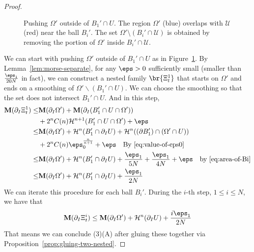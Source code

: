 \begin{lemma}
\begin{proof}
\begin{figure}[htbp]
            \caption{Pushing $\Omega'$ outside of $B_1'\cap U$. The region $\Omega'$ (blue) overlaps with $\mathcal{U}$ (red) near the ball $B_i'$. The set $\Omega' \setminus (B_i' \cap \mathcal{U})$ is obtained by removing the portion of $\Omega'$ inside $B_i' \cap \mathcal{U}$.}
            \label{fig:2675}
        \end{figure}
        
        We can start with pushing $\Omega'$ outside of $B_1'\cap U$ as in Figure~\ref{fig:2675}. By Lemma~\ref{lem:morse-separate}, for any $\eps > 0$ sufficiently small (smaller than $\frac{\eps_1}{20N}$ in fact), we can construct a nested family $\br{{\Xi_t^1}}$ that starts on $\Omega'$ and ends on a smoothing of $\Omega'\backslash(B_1'\cap U)$. We can choose the smoothing so that the set does not intersect $B_1'\cap U$. And in this step, 
        \begin{equation*}
            \begin{split}
                \mathbf{M}(\partial_I\Xi_t^1) \leq& \mathbf{M}(\partial_I\Omega') + \mathbf{M}(\partial_I(B_1'\cap U\cap \Omega'))\\
                &+2^nC(n)\mathcal{H}^{n+1}(B_1'\cap U\cap \Omega') + \eps\\
                \leq& \mathbf{M}(\partial_I\Omega') + \mathcal{H}^n(B_1'\cap \partial_I U) + \mathcal{H}^n((\partial B_1')\cap (\Omega'\cap U))\\
                &+2^nC(n)\eps_0^{\frac{n}{n + 1}} + \eps \quad\text{By \ref{eq:value-of-eps0}}\\
                \leq& \mathbf{M}(\partial_I\Omega') + \mathcal{H}^n(B_1'\cap \partial_I U) + \frac{\eps_1}{5N} + \frac{\eps_1}{4N} + \eps\quad\text{by~\ref{eq:area-of-Bi}}\\
                \leq& \mathbf{M}(\partial_I\Omega') + \mathcal{H}^n(B_1'\cap \partial_I U) + \frac{\eps_1}{2N}
            \end{split}
        \end{equation*}
        We can iterate this procedure for each ball $B_i'$. During the $i$-th step, $1 \leq i \leq N$, we have that 
        \begin{equation*}
            \mathbf{M}(\partial_I\Xi_t^i) \leq \mathbf{M}(\partial_I\Omega') + \mathcal{H}^n( \partial_I U) + \frac{i\eps_1}{2N}
        \end{equation*}
        That means we can conclude (3)(A) after gluing these together via Proposition~\ref{prop:gluing-two-nested}.
    \end{proof}
\end{lemma}

